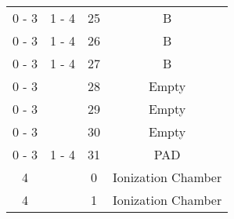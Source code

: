 \begin{tabular}{cccc}
0 - 3  &  1 - 4   &  25     &  B                   \\
0 - 3  &  1 - 4   &  26     &  B                   \\
0 - 3  &  1 - 4   &  27     &  B                   \\
0 - 3  &          &  28     &  Empty               \\
0 - 3  &          &  29     &  Empty               \\
0 - 3  &          &  30     &  Empty               \\
0 - 3  &  1 - 4   &  31     &  PAD                 \\
  4    &          &  0      &  Ionization Chamber  \\
  4    &          &  1      &  Ionization Chamber  \\
\hline
\end{tabular}